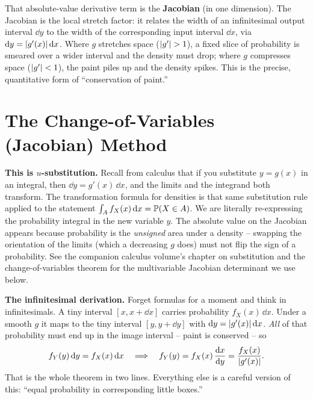 That absolute-value derivative term is the \textbf{Jacobian} (in one dimension). The
Jacobian is the local stretch factor: it relates the width of an infinitesimal output
interval $\dd y$ to the width of the corresponding input interval $\dd x$, via
$\mathrm{d} y = \lvert g'(x)\rvert\,\mathrm{d} x$. Where $g$ stretches space ($\lvert g'\rvert > 1$), a fixed slice of
probability is smeared over a wider interval and the density must drop; where $g$
compresses space ($\lvert g'\rvert < 1$), the paint piles up and the density spikes. This is the
precise, quantitative form of ``conservation of paint.''

\section{The Change-of-Variables (Jacobian) Method}
\label{ch16:jacobian}

\begin{connectionbox}
\textbf{This is $u$-substitution.} Recall from calculus that if you substitute
$y = g(x)$ in an integral, then $\dd y = g'(x)\,\dd x$, and the limits and the integrand
both transform. The transformation formula for densities is that same substitution rule
applied to the statement $\int_A f_X(x)\,\mathrm{d} x = \operatorname{\mathbb{P}}(X \in A)$. We are literally
re-expressing the probability integral in the new variable $y$. The absolute value on the
Jacobian appears because probability is the \emph{unsigned} area under a density --
swapping the orientation of the limits (which a decreasing $g$ does) must not flip the sign
of a probability. See the companion calculus volume's chapter on substitution and the
change-of-variables theorem for the multivariable Jacobian determinant we use below.
\end{connectionbox}

\begin{whybox}
\textbf{The infinitesimal derivation.} Forget formulas for a moment and think in
infinitesimals. A tiny interval $[x, x+\dd x]$ carries probability $f_X(x)\,\dd x$. Under
a smooth $g$ it maps to the tiny interval $[y, y+\dd y]$ with $\mathrm{d} y = \lvert g'(x)\rvert\,\mathrm{d} x$.
\emph{All} of that probability must end up in the image interval -- paint is conserved --
so
\[
  f_Y(y)\,\mathrm{d} y = f_X(x)\,\mathrm{d} x
  \quad\Longrightarrow\quad
  f_Y(y) = f_X(x)\,\frac{\mathrm{d} x}{\mathrm{d} y} = \frac{f_X(x)}{\lvert g'(x)\rvert}.
\]
That is the whole theorem in two lines. Everything else is a careful version of this:
``equal probability in corresponding little boxes.''
\end{whybox}

